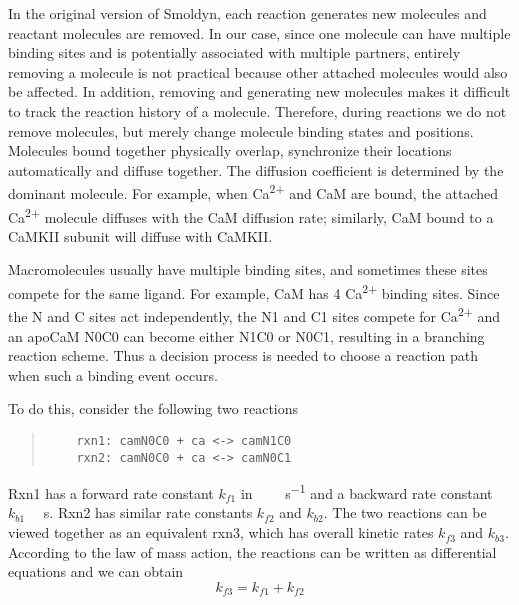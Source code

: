 \documentclass[10pt,letterpaper]{article}
\begin{document}
In the original version of Smoldyn, each reaction generates new molecules and reactant molecules are removed. In our case, since one molecule can have multiple binding sites and is potentially associated with multiple partners, entirely removing a molecule is not practical because other attached molecules would also be affected. In addition, removing and generating new molecules makes it difficult to track the reaction history of a molecule. Therefore, during reactions we do not remove molecules, but merely change molecule binding states and positions. Molecules bound together physically overlap, synchronize their locations automatically and diffuse together. The diffusion coefficient is determined by the dominant molecule. For example, when Ca\textsuperscript{2+} and CaM are bound, the attached Ca\textsuperscript{2+} molecule diffuses with the CaM diffusion rate; similarly, CaM bound to a CaMKII subunit will diffuse with CaMKII.

Macromolecules usually have multiple binding sites, and sometimes these sites compete for the same ligand. For example, CaM has 4 Ca\textsuperscript{2+} binding sites. Since the N and C sites act independently, the N1 and C1 sites compete for Ca\textsuperscript{2+} and an apoCaM N0C0 can become either N1C0 or N0C1, resulting in a branching reaction scheme. Thus a decision process is needed to choose a reaction path when such a binding event occurs. 

To do this, consider the following two reactions
\begin{quote}
\begin{verbatim}
	rxn1: camN0C0 + ca <-> camN1C0
	rxn2: camN0C0 + ca <-> camN0C1
\end{verbatim}
\end{quote}

Rxn1 has a forward rate constant $k_{f1}$ in \SI{}{\per\micro\Molar\per\s} and a backward rate constant $k_{b1}$ \SI{}{\per\s}. Rxn2 has similar rate constants $k_{f2}$ and $k_{b2}$. The two reactions can be viewed together as an equivalent rxn3, which has overall kinetic rates $k_{f3}$ and $k_{b3}$. According to the law of mass action, the reactions can be written as differential equations and we can obtain
\begin{equation}
	k_{f3}=k_{f1}+k_{f2}
\end{equation}
\end{document}

